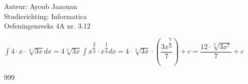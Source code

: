 \documentclass[a4paper]{article}
\begin{document}
\noindent \large Auteur: Ayoub Jaaouan \\
\noindent \large Studierichting: Informatica\\
\noindent \large Oefeningenreeks 4A nr. 3.12\\

\medskip

\normalsize

$\displaystyle\int 4\cdot x\cdot \sqrt[3]{3x}  dx =  4\sqrt[3]{3x}\displaystyle\int x^{\dfrac{3}{3}} \cdot x^{\dfrac{1}{3}}  dx = 4\cdot \sqrt[3]{3x}\cdot \left(\dfrac{3x^{\dfrac{7}{3}}}{7}\right) + c = \dfrac{12\cdot \sqrt[3]{3x^7}}{7}  + c $\\


\begin{thebibliography}{999}
\end{thebibliography}
\end{document}
